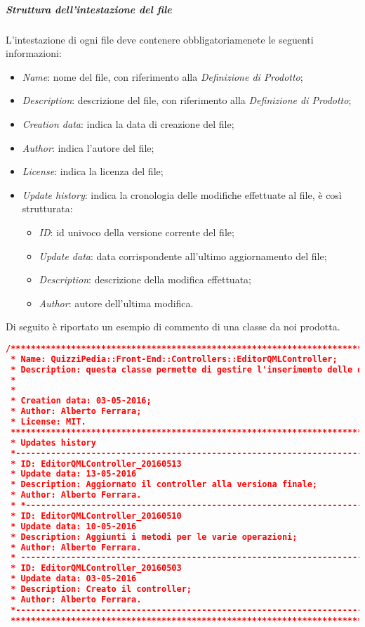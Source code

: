 \subparagraph{Struttura dell'intestazione del file}
L'intestazione di ogni file deve contenere obbligatoriamenete le seguenti informazioni:
\begin{itemize}
\item \textit{Name}: nome del file, con riferimento alla \textit{Definizione di Prodotto};
\item \textit{Description}: descrizione del file, con riferimento alla \textit{Definizione di Prodotto};
\item \textit{Creation data}: indica la data di creazione del file;
\item \textit{Author}: indica l'autore del file;
\item \textit{License}: indica la licenza del file;
\item \textit{Update history}: indica la cronologia delle modifiche effettuate al file, è così strutturata:
\begin{itemize}
\item \textit{ID}: id univoco della versione corrente del file;
\item \textit{Update data}: data corrispondente all'ultimo aggiornamento del file;
\item \textit{Description}: descrizione della modifica effettuata;
\item \textit{Author}: autore dell'ultima modifica.
\end{itemize} 

\end{itemize}
Di seguito è riportato un esempio di commento di una classe da noi prodotta.
\begin{lstlisting}[language=json,firstnumber=1]
/**********************************************************************
 * Name: QuizziPedia::Front-End::Controllers::EditorQMLController;
 * Description: questa classe permette di gestire l'inserimento delle domande QML
 *
 *
 * Creation data: 03-05-2016;
 * Author: Alberto Ferrara;
 * License: MIT.
 **********************************************************************
 * Updates history
 *---------------------------------------------------------------------
 * ID: EditorQMLController_20160513
 * Update data: 13-05-2016
 * Description: Aggiornato il controller alla versiona finale;
 * Author: Alberto Ferrara.
 * *-------------------------------------------------------------------
 * ID: EditorQMLController_20160510
 * Update data: 10-05-2016
 * Description: Aggiunti i metodi per le varie operazioni;
 * Author: Alberto Ferrara.
 * --------------------------------------------------------------------
 * ID: EditorQMLController_20160503
 * Update data: 03-05-2016
 * Description: Creato il controller;
 * Author: Alberto Ferrara.
 *---------------------------------------------------------------------
 **********************************************************************
\end{lstlisting}


